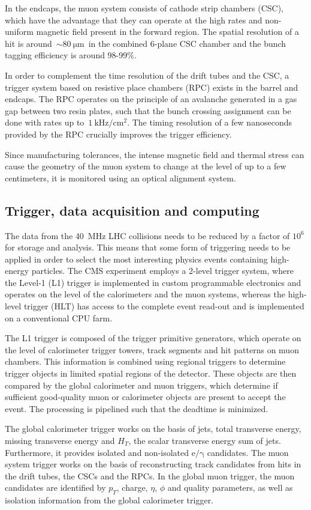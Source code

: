 In the endcaps, the muon system consists of cathode strip chambers (CSC), which have the advantage that they can operate at the high rates and non-uniform magnetic field present in the forward region. The spatial resolution of a hit is around~$\sim 80~\mathrm{\mu m}$~in the combined 6-plane CSC chamber and the bunch tagging efficiency is around 98-99\%.

In order to complement the time resolution of the drift tubes and the CSC, a trigger system based on resistive place chambers (RPC) exists in the barrel and endcaps. The RPC operates on the principle of an avalanche generated in a gas gap between two resin plates, such that the bunch crossing assignment can be done with rates up to~$1~\mathrm{kHz}/\mathrm{cm}^2$. The timing resolution of a few nanoseconds provided by the RPC crucially improves the trigger efficiency.

Since manufacturing tolerances, the intense magnetic field and thermal stress can cause the geometry of the muon system to change at the level of up to a few centimeters, it is monitored using an optical alignment system. 

\subsection{Trigger, data acquisition and computing}
The data from the 40~MHz LHC collisions needs to be reduced by a factor of $10^6$ for storage and analysis. This means that some form of triggering needs to be applied in order to select the most interesting physics events containing high-energy particles. The CMS experiment employs a 2-level trigger system, where the Level-1 (L1) trigger is implemented in custom programmable electronics and operates on the level of the calorimeters and the muon systems, whereas the high-level trigger (HLT) has access to the complete event read-out and is implemented on a conventional CPU farm.

The L1 trigger is composed of the trigger primitive generators, which operate on the level of calorimeter trigger towers, track segments and hit patterns on muon chambers.  This information is combined using regional triggers to determine trigger objects in limited spatial regions of the detector. These objects are then compared by the global calorimeter and muon triggers, which determine if sufficient good-quality muon or calorimeter objects are present to accept the event. The processing is pipelined such that the deadtime is minimized.

The global calorimeter trigger works on the basis of jets, total transverse energy, missing transverse energy and $H_T$, the scalar transverse energy sum of jets. Furthermore, it provides isolated and non-isolated $\mathrm{e}/\mathrm{\gamma}$ candidates. The muon system trigger works on the basis of reconstructing track candidates from hits in the drift tubes, the CSCs and the RPCs. In the global muon trigger, the muon candidates are identified by $p_T$, charge, $\eta$, $\phi$ and quality parameters, as well as isolation information from the global calorimeter trigger.

